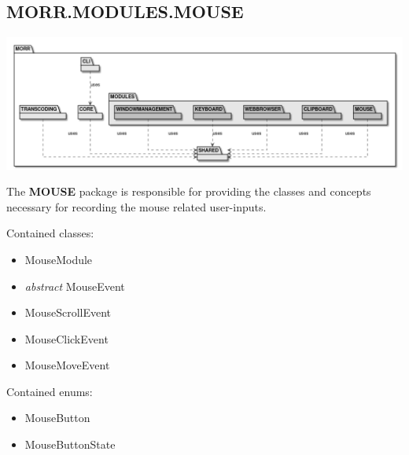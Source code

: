 \newpage
\subsection*{MORR.MODULES.MOUSE}

\begin{center}
    \includegraphics[width=1.0\textwidth]{resources/Packages/AllPackages.png}
\end{center}

The \textbf{MOUSE} package is responsible for providing the classes and concepts necessary for recording the mouse related user-inputs.

Contained classes:
\begin{itemize}
\item MouseModule
\item \textit{abstract} MouseEvent
\item MouseScrollEvent
\item MouseClickEvent
\item MouseMoveEvent
\end{itemize}

Contained enums:
\begin{itemize}
\item MouseButton
\item MouseButtonState
\end{itemize}
